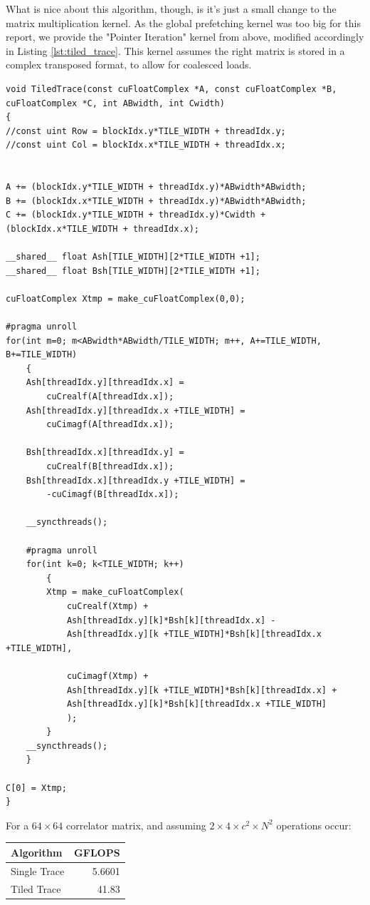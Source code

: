\documentclass[a4paper,12pt]{report}
\newenvironment{CUDAtiming}%
{\setlength{\extrarowheight}{1.5pt} \begin{center}\begin{tabular}{l|r} Algorithm & GFLOPS\\\hline}%
{\end{tabular}\end{center}}
\begin{document}
What is nice about this algorithm, though, is it's just a small change to the matrix multiplication kernel.
As the global prefetching kernel was too big for this report, we provide the "Pointer Iteration" kernel from above, modified accordingly in Listing \ref{lst:tiled_trace}.
This kernel assumes the right matrix is stored in a complex transposed format, to allow for coalesced loads.
\begin{lstlisting}[float,caption=Tiled Tracing Kernel,label=lst:tiled_trace]
void TiledTrace(const cuFloatComplex *A, const cuFloatComplex *B, cuFloatComplex *C, int ABwidth, int Cwidth)
{
//const uint Row = blockIdx.y*TILE_WIDTH + threadIdx.y;
//const uint Col = blockIdx.x*TILE_WIDTH + threadIdx.x;


A += (blockIdx.y*TILE_WIDTH + threadIdx.y)*ABwidth*ABwidth;
B += (blockIdx.x*TILE_WIDTH + threadIdx.y)*ABwidth*ABwidth;
C += (blockIdx.y*TILE_WIDTH + threadIdx.y)*Cwidth + (blockIdx.x*TILE_WIDTH + threadIdx.x);

__shared__ float Ash[TILE_WIDTH][2*TILE_WIDTH +1];
__shared__ float Bsh[TILE_WIDTH][2*TILE_WIDTH +1];

cuFloatComplex Xtmp = make_cuFloatComplex(0,0);

#pragma unroll
for(int m=0; m<ABwidth*ABwidth/TILE_WIDTH; m++, A+=TILE_WIDTH, B+=TILE_WIDTH)
	{
	Ash[threadIdx.y][threadIdx.x] =
		cuCrealf(A[threadIdx.x]);
	Ash[threadIdx.y][threadIdx.x +TILE_WIDTH] =
		cuCimagf(A[threadIdx.x]);
	
	Bsh[threadIdx.x][threadIdx.y] =
		cuCrealf(B[threadIdx.x]);
	Bsh[threadIdx.x][threadIdx.y +TILE_WIDTH] =
		-cuCimagf(B[threadIdx.x]);
	
	__syncthreads();

	#pragma unroll
	for(int k=0; k<TILE_WIDTH; k++)
		{
		Xtmp = make_cuFloatComplex(
			cuCrealf(Xtmp) +
			Ash[threadIdx.y][k]*Bsh[k][threadIdx.x] -
			Ash[threadIdx.y][k +TILE_WIDTH]*Bsh[k][threadIdx.x +TILE_WIDTH],
			
			cuCimagf(Xtmp) +
			Ash[threadIdx.y][k +TILE_WIDTH]*Bsh[k][threadIdx.x] +
			Ash[threadIdx.y][k]*Bsh[k][threadIdx.x +TILE_WIDTH]
			);
		}
	__syncthreads();
	}

C[0] = Xtmp;
}
\end{lstlisting}

For a $64 \times 64$ correlator matrix, and assuming $2 \times 4 \times c^2 \times N^2$ operations occur:

\begin{CUDAtiming}
Single Trace & 5.6601\\
Tiled Trace & 41.83
\end{CUDAtiming}
\end{document}
